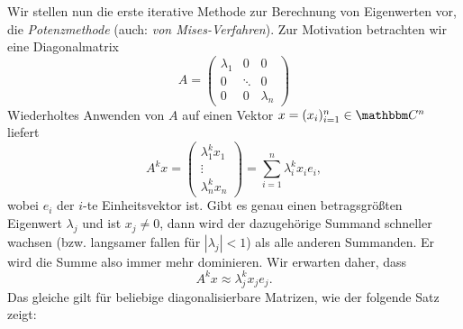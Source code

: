 \documentclass[12pt,a4paper]{book}
\theoremstyle{break}
\theoremstyle{nonumberplain}
\newcommand{\C}{\mathbbm C}
\newcommand{\1}{\mathbbm{1}} 			      	%
\begin{document}
Wir stellen nun die erste iterative Methode zur Berechnung von Eigenwerten vor, die \emph{Potenzmethode} (auch: \emph{von Mises-Verfahren}).
 Zur Motivation betrachten wir eine
Diagonalmatrix 
\[
A=\begin{pmatrix} \lambda_1 & 0 & 0\\ 0 & \ddots & 0\\ 0 & 0 & \lambda_n\end{pmatrix}
\]
Wiederholtes Anwenden von $A$ auf einen Vektor $x=(x_i)_{i=1}^n\in \C^n$ liefert
\[
A^k x=\begin{pmatrix} \lambda_1^k x_1\\ \vdots \\ \lambda_n^k x_n\end{pmatrix} = \sum_{i=1}^n \lambda_i^k x_i e_i,
\]
wobei $e_i$ der $i$-te Einheitsvektor ist. 
Gibt es genau einen betragsgrößten Eigenwert $\lambda_j$ und ist $x_j\neq 0$, dann wird der 
dazugehörige Summand schneller wachsen (bzw. langsamer fallen für $|\lambda_j|<1$) als alle anderen Summanden. 
Er wird die Summe also immer mehr dominieren. Wir erwarten daher, dass
\[
A^k x\approx \lambda_j^k x_j e_j.
\]
Das gleiche gilt für beliebige diagonalisierbare Matrizen, wie der folgende Satz zeigt:
\end{document}
